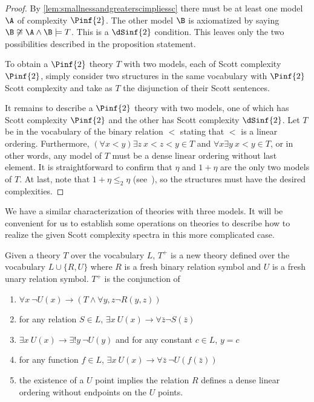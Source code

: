 \documentclass[10pt,a4paper]{amsart}
\renewcommand{\-}{\text{-}}
\begin{document}
\begin{proof}
By \cref{lem:smallnessandgreaterscimpliessc} there must be at least one model $\A$ of complexity $\Pinf{2}$.
The other model $\B$ is axiomatized by saying $\B\not\cong\A\land\B\models T$.
This is a $\dSinf{2}$ condition.
This leaves only the two possibilities described in the proposition statement.

To obtain a $\Pinf{2}$ theory $T$ with two models, each of Scott complexity $\Pinf{2}$, simply consider two structures in the same vocabulary with $\Pinf{2}$ Scott complexity and take as $T$ the disjunction of their Scott sentences.

It remains to describe a $\Pinf{2}$ theory with two models, one of which has Scott complexity $\Pinf{2}$ and the other has Scott complexity $\dSinf{2}$.
Let $T$ be in the vocabulary of the binary relation $<$ stating that $<$ is a linear ordering.
Furthermore, $(\forall x<y) \exists z\ x<z<y\in T$ and $\forall x\exists y \ x<y\in T$, or in other words, any model of $T$ must be a dense linear ordering without last element.
It is straightforward to confirm that $\eta$ and $1+\eta$ are the only two models of $T$. %
At last, note that $1+\eta\leq_2 \eta$ (see~\cite[Lemma 2.4]{GR24}), so the structures must have the desired complexities.
\end{proof}

We have a similar characterization of theories with three models.
It will be convenient for us to establish some operations on theories to describe how to realize the given Scott complexity spectra in this more complicated case.

\begin{definition}
Given a theory $T$ over the vocabulary $L$, $T^+$ is a new theory defined over the vocabulary $L\cup\{R,U\}$ where $R$ is a fresh binary relation symbol and $U$ is a fresh unary relation symbol.
$T^+$ is the conjunction of 
\begin{enumerate}
	\item $\forall x\ \lnot U(x)\to (T\land \forall y,z \lnot R(y,z))$
	\item for any relation $S\in L$, $\exists x\  U(x) \to \forall \bar{z} \lnot S(\bar{z})$
	\item $\exists x\ U(x) \to \exists! y\ \lnot U(y)$ and for any constant $c\in L$, $y=c$
	\item for any function $f\in L$, $\exists x\  U(x) \to \forall \bar{z}\  \lnot U(f(\bar{z}))$
	\item the existence of a $U$ point implies the relation $R$ defines a dense linear ordering without endpoints on the $U$ points.
\end{enumerate}
\end{definition}
\end{document}
